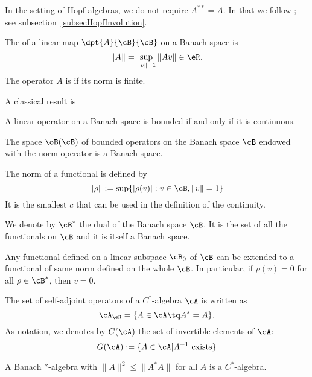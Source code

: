 \begin{remark}
    In the setting of Hopf algebras, we do not require \( A^{**}=A\). In that we follow \cite{SoibelmanI}; see subsection~\ref{subsecHopfInvolution}.
\end{remark}

\begin{definition}
The  of a linear map $\dpt{A}{\cB}{\cB}$ on a Banach space is
\[
   \|A\|=\sup_{\|v\|=1}\|Av\|\in\eR.
\]
The operator $A$ is  if its norm is finite. \label{def:normappl}
\end{definition}

A classical result is
\begin{proposition}
A linear operator on a Banach space is bounded if and only if it is continuous.\label{prop:cont_born}
\end{proposition}

\begin{proposition}
The space $\oB(\cB)$ of bounded operators on the Banach space $\cB$ endowed with the norm operator is a Banach space.
\end{proposition}

The norm of a functional is defined by
\[
   \|\rho\|:=\sup\{ |\rho(v)|:v\in\cB,\|v\|=1  \}
\]
It is the smallest $c$ that can be used in the definition of the continuity.

We denote by $\cB^*$ the dual of the Banach space $\cB$. It is the set of all the functionals on $\cB$ and it is itself a Banach space.

\begin{theorem} \label{tho:hahnBanach}
Any functional defined on a linear subspace $\cB_0$ of $\cB$ can be extended to a functional of same norm defined on the whole $\cB$. In particular, if $\rho(v)=0$ for all $\rho\in\cB^*$, then $v=0$.
\end{theorem}



The set of self-adjoint operators of a $C^*$-algebra $\cA$ is written as
\[
  \cA_{\eR}=\{A\in\cA\tq A^*=A\}.
\]
As notation, we denotes by $G(\cA)$ the set of invertible elements of $\cA$:
\[
   G(\cA):=\{A\in\cA|A^{-1}\text{ exists}\}
\]

\begin{lemma}
A Banach $*$-algebra with $\|A\|^2\leq\|A^*A\|$ for all $A$ is a $C^*$-algebra.\label{lem:STARAlC}
\end{lemma}

